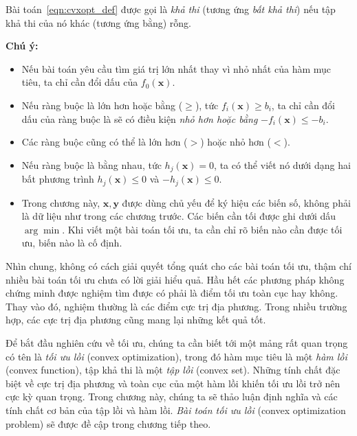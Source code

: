 Bài toán~\eqref{eqn:cvxopt_def} được gọi là \textit{khả thi} (tương ứng \textit{bất khả thi}) nếu tập khả thi của nó khác (tương ứng bằng) rỗng.


\textbf{Chú ý:}
\begin{itemize}
\item Nếu bài toán yêu cầu tìm giá trị lớn nhất thay vì nhỏ nhất của hàm mục
tiêu, ta chỉ cần đổi dấu của $f_0(\mathbf{x})$.

\item Nếu ràng buộc là {lớn hơn hoặc bằng} ($\geq$), tức $f_i(\mathbf{x}) \geq b_i$, ta chỉ cần đổi dấu của ràng buộc là sẽ có điều kiện \textit{nhỏ hơn hoặc bằng} $-f_i(\mathbf{x}) \leq -b_i$.

\item Các ràng buộc cũng có thể là {lớn hơn} ($>$) hoặc {nhỏ hơn} ($<$).

\item Nếu ràng buộc là {bằng nhau}, tức $h_j(\mathbf{x}) = 0$, ta có thể viết nó dưới dạng hai bất phương trình $h_j(\mathbf{x}) \leq 0$ và $-h_j(\mathbf{x}) \leq 0$.

\item Trong chương này, $\mathbf{x}, \mathbf{y}$ được dùng chủ yếu để ký
hiệu các biến số, không phải là dữ liệu như trong các chương trước. Các biến cần
tối được ghi dưới dấu $\arg \min$. Khi viết một bài toán
tối ưu, ta cần chỉ rõ biến nào cần được tối ưu, biến nào là cố định.

\end{itemize}
Nhìn chung, không có cách giải quyết tổng quát cho các bài toán tối ưu, thậm chí
nhiều bài toán tối ưu chưa có lời giải hiểu quả. Hầu hết các phương pháp không
chứng minh được nghiệm tìm được có phải là điểm tối ưu toàn cục hay không. Thay vào đó,
nghiệm thường là các điểm cực trị địa phương. Trong nhiều
trường hợp, các cực trị địa phương cũng mang lại những kết quả tốt.

Để bắt đầu nghiên cứu về tối ưu, chúng ta cần biết tới một mảng rất quan trọng có tên là \textit{tối ưu lồi} ({convex optimization}), trong đó
{hàm mục tiêu} là một \textit{hàm lồi} ({convex function}), tập khả thi là một \textit{tập lồi} (convex set). Những tính chất đặc
biệt về cực trị địa phương và toàn cục của một {hàm
lồi} khiến tối ưu lồi trở nên cực kỳ quan trọng. Trong chương này, chúng ta sẽ
thảo luận định nghĩa và các tính chất cơ bản của {tập lồi} và {hàm
lồi}. \textit{Bài toán tối ưu lồi} ({convex optimization problem}) sẽ
được đề cập trong chương tiếp theo.

